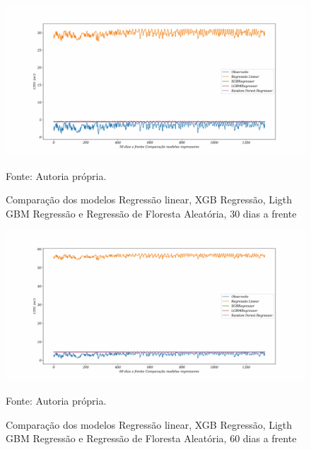 \begin{figure}[H]
	\centering
	\caption{Comparação dos modelos Regressão linear, XGB Regressão, Ligth GBM Regressão e Regressão de Floresta Aleatória, 30 dias a frente }
	\label{fig:30-LR-XGB-LGBM-RF}
	\includegraphics[width=1\linewidth]{Apendices/Figuras/modelagem-18-a-21h/30-LR-XGB-LGBM-RF}
	
	Fonte: Autoria própria.
\end{figure}

\begin{figure}[H]
	\centering
	\caption{Comparação dos modelos Regressão linear, XGB Regressão, Ligth GBM Regressão e Regressão de Floresta Aleatória, 60 dias a frente }
	\label{fig:60-LR-XGB-LGBM-RF}
	\includegraphics[width=1\linewidth]{Apendices/Figuras/modelagem-18-a-21h/60-LR-XGB-LGBM-RF}
	
	Fonte: Autoria própria.
\end{figure}